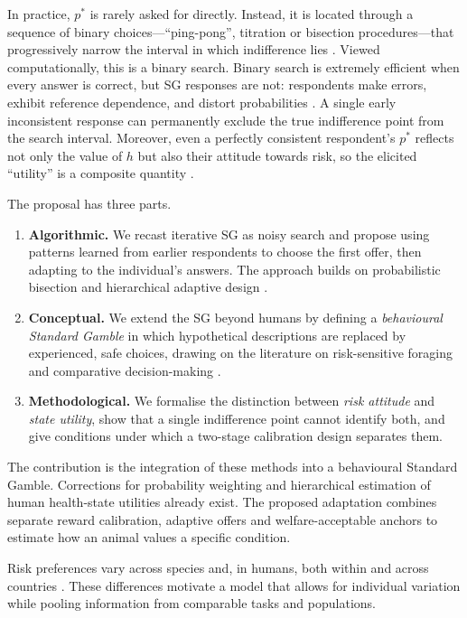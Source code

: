 \documentclass[11pt,a4paper]{article}
\begin{document}
In practice, $p^\ast$ is rarely asked for directly. Instead, it is located through a sequence of binary choices---``ping-pong'', titration or bisection procedures---that progressively narrow the interval in which indifference lies \citep{lenert1998}. Viewed computationally, this is a binary search. Binary search is extremely efficient when every answer is correct, but SG responses are not: respondents make errors, exhibit reference dependence, and distort probabilities \citep{kahneman1979,tversky1992,bleichrodt2002}. A single early inconsistent response can permanently exclude the true indifference point from the search interval. Moreover, even a perfectly consistent respondent's $p^\ast$ reflects not only the value of $h$ but also their attitude towards risk, so the elicited ``utility'' is a composite quantity \citep{bleichrodt2001}.

The proposal has three parts.
\begin{enumerate}[leftmargin=*]
  \item \textbf{Algorithmic.} We recast iterative SG as noisy search and propose using patterns learned from earlier respondents to choose the first offer, then adapting to the individual's answers. The approach builds on probabilistic bisection \citep{horstein1963,burnashev1974,waeber2013} and hierarchical adaptive design \citep{myung2013,cavagnaro2013,kim2014}.
  \item \textbf{Conceptual.} We extend the SG beyond humans by defining a \emph{behavioural Standard Gamble} in which hypothetical descriptions are replaced by experienced, safe choices, drawing on the literature on risk-sensitive foraging and comparative decision-making \citep{caraco1980,kacelnik1996,heilbronner2008,stauffer2015}.
  \item \textbf{Methodological.} We formalise the distinction between \emph{risk attitude} and \emph{state utility}, show that a single indifference point cannot identify both, and give conditions under which a two-stage calibration design separates them.
\end{enumerate}

The contribution is the integration of these methods into a behavioural Standard Gamble. Corrections for probability weighting and hierarchical estimation of human health-state utilities already exist. The proposed adaptation combines separate reward calibration, adaptive offers and welfare-acceptable anchors to estimate how an animal values a specific condition.

Risk preferences vary across species and, in humans, both within and across countries \citep{heilbronner2008,rosati2011,hayden2007,falk2018}. These differences motivate a model that allows for individual variation while pooling information from comparable tasks and populations.
\end{document}
